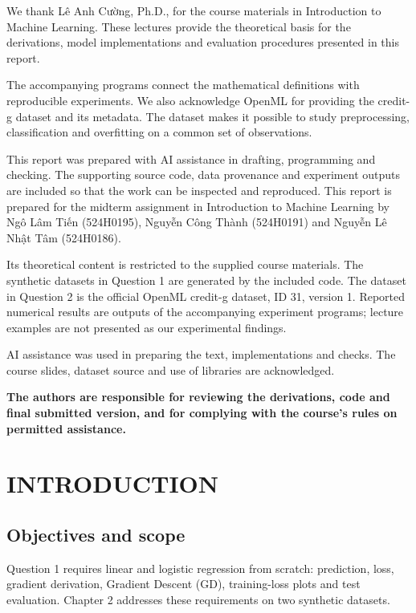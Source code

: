 


\shownumtrue{}\renewcommand{\pagesize}{12}
We thank Lê Anh Cường, Ph.D., for the course materials in Introduction to Machine Learning. These lectures provide the theoretical basis for the derivations, model implementations and evaluation procedures presented in this report.

The accompanying programs connect the mathematical definitions with reproducible experiments. We also acknowledge OpenML for providing the credit-g dataset and its metadata. The dataset makes it possible to study preprocessing, classification and overfitting on a common set of observations.

This report was prepared with AI assistance in drafting, programming and checking. The supporting source code, data provenance and experiment outputs are included so that the work can be inspected and reproduced.
\signblock\clearpage
{}
This report is prepared for the midterm assignment in Introduction to Machine Learning by Ngô Lâm Tiến (524H0195), Nguyễn Công Thành (524H0191) and Nguyễn Lê Nhật Tâm (524H0186).

Its theoretical content is restricted to the supplied course materials. The synthetic datasets in Question 1 are generated by the included code. The dataset in Question 2 is the official OpenML credit-g dataset, ID 31, version 1. Reported numerical results are outputs of the accompanying experiment programs; lecture examples are not presented as our experimental findings.

AI assistance was used in preparing the text, implementations and checks. The course slides, dataset source and use of libraries are acknowledged.

\textbf{The authors are responsible for reviewing the derivations, code and final submitted version, and for complying with the course's rules on permitted assistance.}
\signblock\clearpage
\renewcommand{\pagesize}{13}
\makeatletter{}\makeatother\clearpage
{}\makeatletter{}\makeatother\clearpage
{}

\chapter{INTRODUCTION}
\section{Objectives and scope}
Question 1 requires linear and logistic regression from scratch: prediction, loss, gradient derivation, Gradient Descent (GD), training-loss plots and test evaluation. Chapter 2 addresses these requirements on two synthetic datasets.

